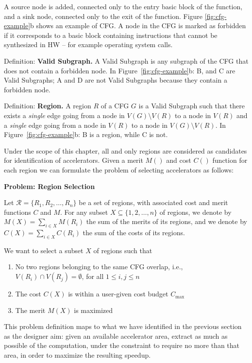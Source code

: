 \documentclass[]{usiinfthesis}
\begin{document}
A source node is added, connected only to the entry basic block of
the function, and a sink node, connected only to the exit of the
function. Figure \ref{fig:cfg-example}b shows an example of CFG. A
node in the CFG is marked as forbidden if it corresponds to a basic
block containing instructions that cannot be synthesized in HW -- for
example operating system calls.\par

Definition: \textbf{Valid Subgraph.}  A Valid Subgraph is any subgraph
of the CFG that does not contain a forbidden node. In
Figure~\ref{fig:cfg-example}b: B, and C are Valid Subgraphs; A and D
are not Valid Subgraphs because they contain a forbidden node.\par

Definition: \textbf{Region.} A region $R$ of a CFG $G$ is a Valid
Subgraph such that there exists a \emph{single} edge going from a node
in $V(G)\setminus V(R)$ to a node in $V(R)$ and a \emph{single} edge
going from a node in $V(R)$ to a node in $V(G)\setminus V(R)$. In
Figure~\ref{fig:cfg-example}b: B is a region, while C is not.\par

Under the scope of this chapter, all and only regions are considered as
candidates for identification of accelerators.
Given a merit $M()$ and cost $C()$ function for each region 
we can formulate the problem of selecting accelerators as follows:

\textbf{Problem: Region Selection}

Let $\mathcal{R} = \{ R_1, R_2, \ldots, R_n \}$ be a set of regions,
with associated cost and merit functions $C$ and $M$.
For any subset $X\subseteq \{1,2,\ldots,n\}$ of regions,
we denote by $M(X) = \sum_{i\in X} M(R_i)$ the sum of the merits of
its regions, and we denote by $C(X) = \sum_{i\in X} C(R_i)$ the sum of
the costs of its regions.

We want to select a subset $X$ of regions such that
\begin{enumerate}
\item No two regions belonging to the same CFG overlap, i.e.,
  $V(R_i)\cap V(R_j) = \emptyset$, for all $1\le i,j\le n$
\item The cost $C(X)$ is within a user-given cost budget $C_{\max}$
\item The merit $M(X)$ is maximized
\end{enumerate}

This problem definition maps to what we have identified in the previous 
section as the designer aim: given an available
accelerator area, extract as much as possible of the computation,
under the constraint to require no more than that area, in order to
maximize the resulting speedup.
\end{document}

